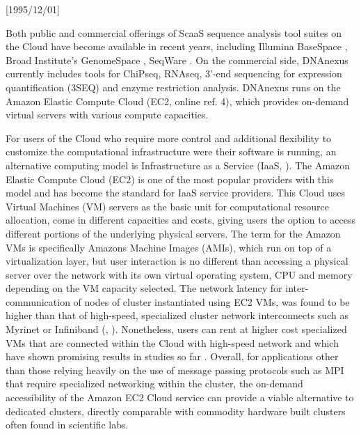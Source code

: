 \NeedsTeXFormat{LaTeX2e}[1995/12/01] \documentclass[10pt]{bmc_article}
\newenvironment{bmcformat}{\begin{raggedright}\baselineskip20pt\sloppy\setboolean{publ}{false}}{\end{raggedright}\baselineskip20pt\sloppy}
\begin{document}
\begin{bmcformat}
Both public and commercial offerings of ScaaS sequence analysis tool suites on the Cloud have become available
in recent years, including  Illumina BaseSpace \cite{basespace}, Broad Institute's GenomeSpace \cite{genomespace}, 
SeqWare \cite{d2010seqware}. On the commercial side, DNAnexus \cite{dnanexus} currently includes tools for ChiPseq, 
RNAseq, 3'-end sequencing for expression quantification (3SEQ) and enzyme restriction analysis. DNAnexus runs on 
the Amazon Elastic Compute Cloud (EC2, online ref. 4), which provides on-demand virtual servers with various compute 
capacities. 

For users of the Cloud who require more control and additional flexibility to customize the computational infrastructure 
were their software is running, an alternative computing model is Infrastructure as a Service (IaaS, \cite{bhardwaj2010cloud}).
The Amazon Elastic Compute Cloud (EC2) is one of the most popular providers with this model and has become the 
standard for  IaaS service providers. This Cloud uses Virtual Machines (VM) servers as the basic unit for computational 
resource allocation, come in different capacities and costs, giving users the option to access different portions \cite{}  
of the underlying physical servers. The term for the Amazon VMs is specifically Amazons Machine Images (AMIs), which 
run on top of a virtualization layer, but user interaction is no different than accessing a physical server over the 
network with its own virtual operating system, CPU and memory depending on the VM capacity selected. The network 
latency for inter-communication of nodes of cluster instantiated using EC2 VMs, was found to be higher \cite{hill2009quantitative} 
than that of high-speed, specialized cluster network interconnects such as Myrinet or Infiniband (\cite{boden1995myrinet},
\cite{infiniband2000infiniband}). Nonetheless, users can rent at higher cost specialized VMs that are connected within 
the Cloud with high-speed network \cite{instancetypes} and which have shown promising results in studies so far 
\cite{jackson2010}. Overall, for applications other than those relying heavily on the use of message passing protocols 
such as MPI \cite{} that require specialized networking within the cluster,  the on-demand accessibility of the Amazon 
EC2 Cloud service can provide a viable alternative to dedicated clusters, directly comparable with commodity hardware 
built clusters often found in scientific labs. 


\end{bmcformat}
\end{document}
